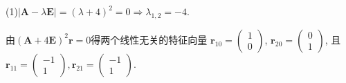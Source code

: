 \begin{solve}
(1)$|\bm{A}-\lambda\bm{E}|=(\lambda+4)^2=0\Rightarrow\lambda_{1,2}=-4$.

由$(\bm{A}+4\bm{E})^2\bm{r}=0$得两个线性无关的特征向量
$\bm{r}_{10}=\begin{pmatrix}1\\0\end{pmatrix}$,
$\bm{r}_{20}=\begin{pmatrix}0\\1\end{pmatrix}$, 
且$\bm{r}_{11}=\begin{pmatrix}-1\\1\end{pmatrix},\bm{r}_{21}=\begin{pmatrix}-1\\1\end{pmatrix}$.


\end{solve}
